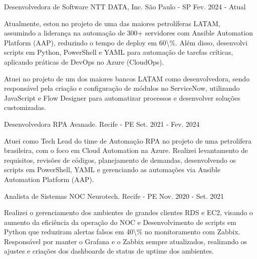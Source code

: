 

\begin{cventries}

  \cventry
    {Desenvolvedora de Software} %
    {NTT DATA, Inc.} %
    {São Paulo - SP} %
    {Fev. 2024 - Atual} %
    {
      \begin{cvitems} %
        \item {Atualmente, estou no projeto de uma das maiores petrolíferas LATAM, assumindo a liderança na automação de 300+ servidores com Ansible Automation Platform (AAP), reduzindo o tempo de deploy em 60\textbackslash{}\%. Além disso, desenvolvi scripts em Python, PowerShell e YAML para automação de tarefas críticas, aplicando práticas de DevOps no Azure (CloudOps).}
        \item {Atuei no projeto de um dos maiores bancos LATAM como desenvolvedora, sendo responsável pela criação e configuração de módulos no ServiceNow, utilizando JavaScript e Flow Designer para automatizar processos e desenvolver soluções customizadas.}
      \end{cvitems}
    }

  \cventry
    {Desenvolvedora RPA} %
    {Avanade.} %
    {Recife - PE} %
    {Set. 2021 - Fev. 2024} %
    {
      \begin{cvitems} %
        \item {Atuei como Tech Lead do time de Automação RPA no projeto de uma petrolifera brasileira, com o foco em Cloud Automation na Azure. Realizei levantamento de requisitos, revisões de códigos, planejamento de demandas, desenvolvendo os scripts em PowerShell, YAML e gerenciando as automações via Ansible Automation Platform (AAP).}
      \end{cvitems}
    }

  \cventry
    {Analista de Sistemas NOC} %
    {Neurotech.} %
    {Recife - PE} %
    {Nov. 2020 - Set. 2021} %
    {
      \begin{cvitems} %
        \item {Realizei o gerenciamento dos ambientes de grandes clientes RDS e EC2, visando o aumento da eficiência da operação do NOC e Desenvolvimento de scripts em Python que reduziram alertas falsos em 40\textbackslash{}\% no monitoramento com Zabbix. Responsável por manter o Grafana e o Zabbix sempre atualizados, realizando os ajustes e criações dos dashboards de status de uptime dos ambientes.}
      \end{cvitems}
    }

\end{cventries}
